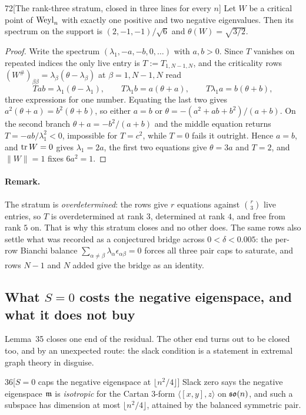\begin{Lem}{72}[The rank-three stratum, closed in three lines for every $n$]
Let $W$ be a critical point of $\mathrm{Weyl}_n$ with exactly one positive and two negative eigenvalues. Then its spectrum on the support is $(2,-1,-1)/\sqrt6$ and $\theta(W)=\sqrt{3/2}$.
\end{Lem}

\begin{proof}
Write the spectrum $(\lambda_1,-a,-b,0,\dots)$ with $a,b>0$. Since $T$ vanishes on repeated indices the only live entry is $T:=T_{1,N-1,N}$, and the criticality rows $(W^{\#})_{\beta\beta}=\lambda_\beta(\theta-\lambda_\beta)$ at $\beta=1,N-1,N$ read
\[
Tab=\lambda_1(\theta-\lambda_1),\qquad T\lambda_1b=a(\theta+a),\qquad T\lambda_1a=b(\theta+b),
\]
three expressions for one number. Equating the last two gives $a^2(\theta+a)=b^2(\theta+b)$, so either $a=b$ or $\theta=-(a^2+ab+b^2)/(a+b)$. On the second branch $\theta+a=-b^2/(a+b)$ and the middle equation returns $T=-ab/\lambda_1^{2}<0$, impossible for $T=c^2$, while $T=0$ fails it outright. Hence $a=b$, and $\operatorname{tr} W=0$ gives $\lambda_1=2a$, the first two equations give $\theta=3a$ and $T=2$, and $\|W\|=1$ fixes $6a^2=1$.
\end{proof}

\paragraph{Remark.}
The stratum is \emph{overdetermined}: the rows give $r$ equations against $\binom r3$ live entries, so $T$ is overdetermined at rank $3$, determined at rank $4$, and free from rank $5$ on. That is why this stratum closes and no other does. The same rows also settle what was recorded as a conjectured bridge across $0<\delta<0.005$: the per-row Bianchi balance $\sum_{\alpha\ne\beta}\lambda_\alpha\epsilon_{\alpha\beta}=0$ forces all three pair caps to saturate, and rows $N-1$ and $N$ added give the bridge as an identity.

\subsection{What $S=0$ costs the negative eigenspace, and what it does not buy}\label{sec:horns}

Lemma~35 closes one end of the residual. The other end turns out to be closed too, and by an unexpected route: the slack condition is a statement in extremal graph theory in disguise.

\begin{Lem}{36}[$S=0$ caps the negative eigenspace at $\lfloor n^2/4\rfloor$]
Slack zero says the negative eigenspace $\mathfrak{m}$ is \emph{isotropic} for the Cartan $3$-form $\langle[x,y],z\rangle$ on $\mathfrak{so}(n)$, and such a subspace has dimension at most $\lfloor n^2/4\rfloor$, attained by the balanced symmetric pair.
\end{Lem}

